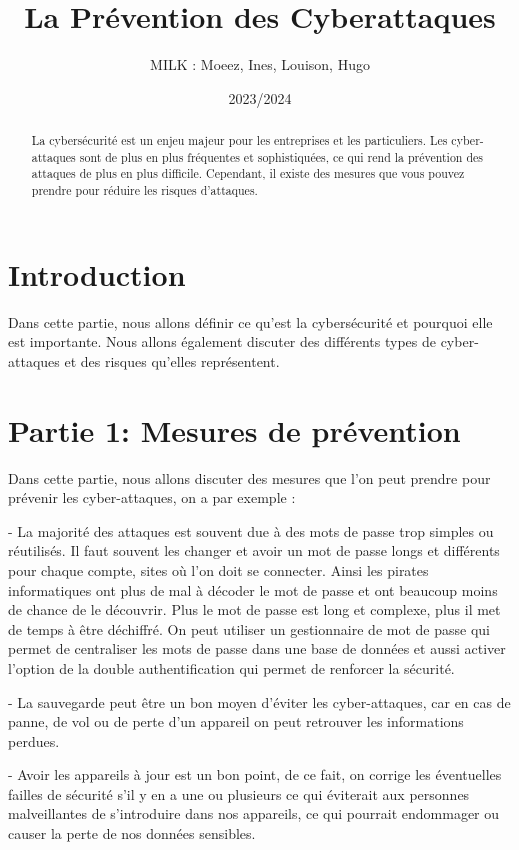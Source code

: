 \documentclass[a4paper,11pt]{article}
\title{La Prévention des Cyberattaques}
\author{MILK : Moeez, Ines, Louison, Hugo}
\date{2023/2024}
\begin{document}
\maketitle

\begin{abstract}
  La cybersécurité est un enjeu majeur pour les entreprises et les particuliers. 
  Les cyber-attaques sont de plus en plus fréquentes et sophistiquées, ce qui rend la prévention des attaques de plus en plus difficile. 
  Cependant, il existe des mesures que vous pouvez prendre pour réduire les risques d’attaques.
\end{abstract}


\section{Introduction}

Dans cette partie, nous allons définir ce qu’est la cybersécurité et pourquoi elle est importante. 
Nous allons également discuter des différents types de cyber-attaques et des risques qu’elles représentent.


\section{Partie 1: Mesures de prévention}

Dans cette partie, nous allons discuter des mesures que l’on peut prendre pour prévenir les cyber-attaques, on a par exemple : 

  - La majorité des attaques est souvent due à des mots de passe trop simples ou réutilisés. Il faut souvent les changer et avoir un mot de passe longs et différents pour chaque compte, sites où l’on doit se connecter. Ainsi les pirates informatiques ont plus de mal à décoder le mot de passe et ont beaucoup moins de chance de le découvrir. Plus le mot de passe est long et complexe, plus il met de temps à être déchiffré. On peut utiliser un gestionnaire de mot de passe qui permet de centraliser les mots de passe dans une base de données et aussi activer l’option de la double authentification qui permet de renforcer la sécurité.

  - La sauvegarde peut être un bon moyen d’éviter les cyber-attaques, car en cas de panne, de vol ou de perte d’un appareil on peut retrouver les informations perdues.

  - Avoir les appareils à jour est un bon point, de ce fait, on corrige les éventuelles failles de sécurité s’il y en a une ou plusieurs ce qui éviterait aux personnes malveillantes de s’introduire dans nos appareils, ce qui pourrait endommager ou causer la perte de nos données sensibles.
\end{document}
